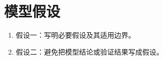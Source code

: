 \section{模型假设}
\begin{enumerate}
  \item 假设一：写明必要假设及其适用边界。
  \item 假设二：避免把模型结论或验证结果写成假设。
\end{enumerate}
